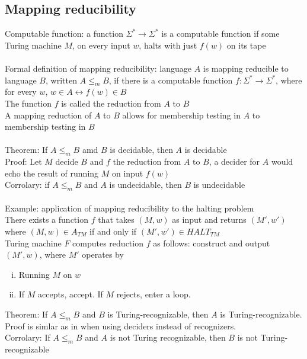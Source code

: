\documentclass{article}
\newcommand*{\<}{\langle}
\renewcommand*{\>}{\rangle}
\begin{document}
		\subsection{Mapping reducibility}
			Computable function: a function $\Sigma^* \to \Sigma^*$ is a computable function if some Turing machine $M$, on every input $w$, halts with just $f(w)$ on its tape \\
			\\
			Formal definition of mapping reducibility: language $A$ is mapping reducible to language $B$, written $A \leq_m B$, if there is a computable function $f: \Sigma^* \to \Sigma^*$, where for every $w$, $w \in A \leftrightarrow f(w) \in B$ \\
			The function $f$ is called the reduction from $A$ to $B$ \\
			A mapping reduction of $A$ to $B$ allows for membership testing in $A$ to membership testing in $B$ \\
			\\
			Theorem: If $A \leq_m B$ amd $B$ is decidable, then $A$ is decidable \\
			Proof: Let $M$ decide $B$ and $f$ the reduction from $A$ to $B$, a decider for $A$ would echo the result of running $M$ on input $f(w)$ \\
			Corrolary: if $A \leq_m B$ and $A$ is undecidable, then $B$ is undecidable \\
			\\
			Example: application of mapping reducibility to the halting problem \\
			There exists a function $f$ that takes $(M, w)$ as input and returns $(M', w')$ where $(M, w) \in A_{TM}$ if and only if $(M', w') \in HALT_{TM}$ \\
			Turing machine $F$ computes reduction $f$ as follows: construct and output $(M', w)$, where $M'$ operates by
			\begin{enumerate}[(i)]
				\item Running $M$ on $w$
				\item If $M$ accepts, accept. If $M$ rejects, enter a loop.
				\end{enumerate}
			Theorem: If $A \leq_m B$ and $B$ is Turing-recognizable, then $A$ is Turing-recognizable. Proof is simlar as in when using deciders instead of recognizers. \\
			Corrolary: If $A \leq_m B$ and $A$ is not Turing recognizable, then $B$ is not Turing-recognizable \\
			\\
\end{document}
